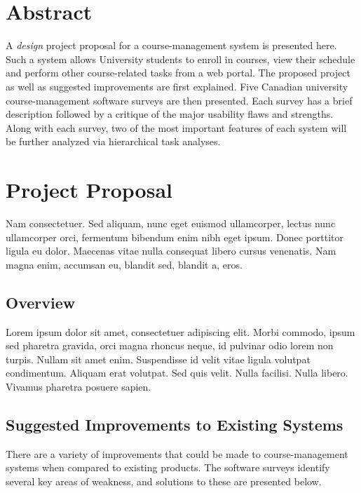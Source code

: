 \documentclass[10pt]{article}
\begin{document}
\begin{multicols}{2}

\section*{Abstract}
A \emph{design} project proposal for a course-management system is presented here. Such a system allows University students to enroll in courses, view their schedule and perform other course-related tasks from a web portal. The proposed project as well as suggested improvements are first explained. Five Canadian university course-management software surveys are then presented. Each survey has a brief description followed by a critique of the major usability flaws and strengths. Along with each survey, two of the most important features of each system will be further analyzed via hierarchical task analyses. 

\section*{Project Proposal}
Nam consectetuer. Sed aliquam, nunc eget euismod ullamcorper, lectus nunc ullamcorper orci, fermentum bibendum enim nibh eget ipsum. Donec porttitor ligula eu dolor. Maecenas vitae nulla consequat libero cursus venenatis. Nam magna enim, accumsan eu, blandit sed, blandit a, eros. 

\subsection*{Overview}
Lorem ipsum dolor sit amet, consectetuer adipiscing elit. Morbi commodo, ipsum sed pharetra gravida, orci magna rhoncus neque, id pulvinar odio lorem non turpis. Nullam sit amet enim. Suspendisse id velit vitae ligula volutpat condimentum. Aliquam erat volutpat. Sed quis velit. Nulla facilisi. Nulla libero. Vivamus pharetra posuere sapien. 

\subsection*{Suggested Improvements to Existing Systems}
There are a variety of improvements that could be made to course-management systems when compared to existing products. The software surveys identify several key areas of weakness, and solutions to these are presented below.\\


\end{multicols}
\end{document}
